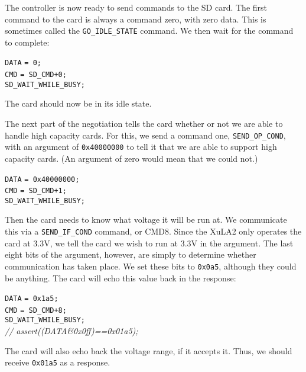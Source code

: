 \documentclass{gqtekspec}
\begin{document}
The controller is now ready to send commands to the SD card.  The first command
to the card is always a command zero, with zero data.  This is sometimes
called the \hbox{\tt GO\_IDLE\_STATE} command.  We then wait for the
command to complete:
\begin{tabbing}
{\tt DATA} \= {\tt = 0;} \\
{\tt CMD} \> {\tt = SD\_CMD+0;} \\
{\tt SD\_WAIT\_WHILE\_BUSY;}
\end{tabbing}
The card should now be in its idle state.

The next part of the negotiation tells the card whether or not we are able to 
handle high capacity cards.  For this, we send a command one,
\hbox{\tt SEND\_OP\_COND}, with an argument of {\tt 0x40000000} to tell it
that we are able to support high capacity cards.  (An argument of zero would
mean that we could not.)
\begin{tabbing}
{\tt DATA} \= {\tt = 0x40000000;} \\
{\tt CMD} \> {\tt = SD\_CMD+1;} \\
{\tt SD\_WAIT\_WHILE\_BUSY;}
\end{tabbing}

Then the card needs to know what voltage it will be run at.  We communicate this
via a \hbox{\tt SEND\_IF\_COND} command, or CMD8.  Since the XuLA2
only operates the card at 3.3V, we tell the card we wish to run at 3.3V in the
argument.  The last eight bits of the argument, however, are simply to determine
whether communication has taken place.  We set these bits to {\tt 0x0a5},
although they could be anything.  The card will echo this value back in the
response:
\begin{tabbing}
{\tt DATA} \= {\tt = 0x1a5;} \\
{\tt CMD} \> {\tt = SD\_CMD+8;} \\
{\tt SD\_WAIT\_WHILE\_BUSY;} \\
{\em // assert((DATA\&0x0ff)==0x01a5);}
\end{tabbing}
The card will also echo back the voltage range, if it accepts it.  Thus,
we should receive {\tt 0x01a5} as a response.
\end{document}

